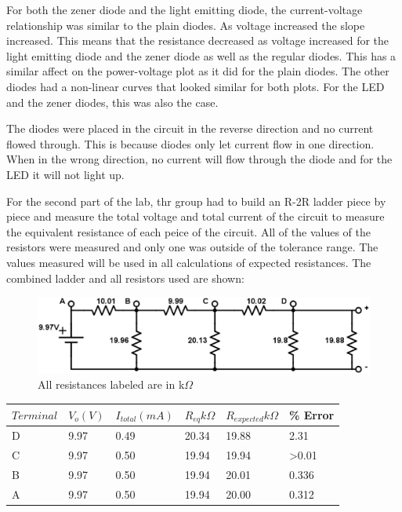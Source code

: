 \documentclass[twocolumn, amsmath]{revtex4}
\begin{document}
For both the zener diode and the light emitting diode, the current-voltage relationship was similar to the plain diodes. As voltage increased the slope increased. This means that the resistance decreased as voltage increased for the light emitting diode and the zener diode as well as the regular diodes. This has a similar affect on the power-voltage plot as it did for the plain diodes. The other diodes had a non-linear curves that looked similar for both plots. For the LED and the zener diodes, this was also the case. 

The diodes were placed in the circuit in the reverse direction and no current flowed through. This is because diodes only let current flow in one direction. When in the wrong direction, no current will flow through the diode and for the LED it will not light up.





For the second part of the lab, thr group had to build an R-2R ladder piece by piece and measure the total voltage and total current of the circuit to measure the equivalent resistance of each peice of the circuit. All of the values of the resistors were measured and only one was outside of the tolerance range. The values measured will be used in all calculations of expected resistances. The combined ladder and all resistors used are shown:

\newpage

\begin{figure}[h]  

\includegraphics[scale = 0.23]{valuesA.eps}  
\caption{All resistances labeled are in k$\Omega$}
\end{figure}



\begin{center}
    \begin{tabular}{| l | l | l | l | l | l|}
    \hline
    $Terminal$ & $V_o (V)$  & $I_{total} (mA)$ & $R_{eq} k\Omega$ & $R_{expected} k\Omega$ & \% Error \\ \hline
    D		& 9.97		& 0.49 		& 20.34		& 19.88 	& 2.31 			  \\ \hline
    C		& 9.97  	& 0.50 		& 19.94		& 19.94		& >0.01			 \\ \hline
    B		& 9.97	 	& 0.50		& 19.94		& 20.01		& 0.336			 \\ \hline
    A   	& 9.97	 	& 0.50  	& 19.94		& 20.00 	& 0.312 		\\ 
    \hline
    \end{tabular}
\end{center}
\end{document}
